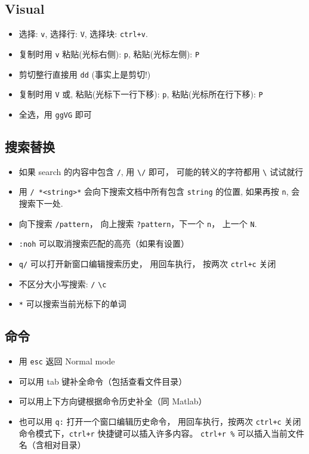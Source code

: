 \subsection{Visual}
\begin{itemize}
\item 选择: \verb`v`, 选择行: \verb`V`, 选择块: \verb`ctrl+v`.
\item 复制时用 \verb`v` 粘贴(光标右侧): \verb`p`, 粘贴(光标左侧): \verb`P`
\item 剪切整行直接用 \verb`dd` (事实上是剪切!)
\item 复制时用 \verb`V` 或, 粘贴(光标下一行下移): \verb`p`, 粘贴(光标所在行下移): \verb`P`
\item 全选，用 \verb`ggVG` 即可
\end{itemize}

\subsection{搜索替换}
\begin{itemize}
\item 如果 search 的内容中包含 \verb`/`, 用 \verb`\/` 即可， 可能的转义的字符都用 \verb`\` 试试就行
\item 用 \verb`/ *<string>*` 会向下搜索文档中所有包含 \verb`string` 的位置, 如果再按 \verb`n`, 会搜索下一处. 
\item 向下搜索 \verb`/pattern`， 向上搜索 \verb`?pattern`，下一个 \verb`n`， 上一个 \verb`N`.
\item \verb`:noh` 可以取消搜索匹配的高亮（如果有设置）
\item \verb`q/` 可以打开新窗口编辑搜索历史， 用回车执行， 按两次 \verb`ctrl+c` 关闭
\item 不区分大小写搜索:  \verb`/` \verb`\c`
\item \verb`*` 可以搜索当前光标下的单词
\end{itemize}

\subsection{命令}
\begin{itemize}
\item 用 \verb`esc` 返回 Normal mode
\item 可以用 tab 键补全命令（包括查看文件目录）
\item 可以用上下方向键根据命令历史补全（同 Matlab）
\item 也可以用 \verb`q:` 打开一个窗口编辑历史命令， 用回车执行，按两次 \verb`ctrl+c` 关闭
命令模式下，\verb`ctrl+r` 快捷键可以插入许多内容。 \verb`ctrl+r %` 可以插入当前文件名（含相对目录）
\end{itemize}

